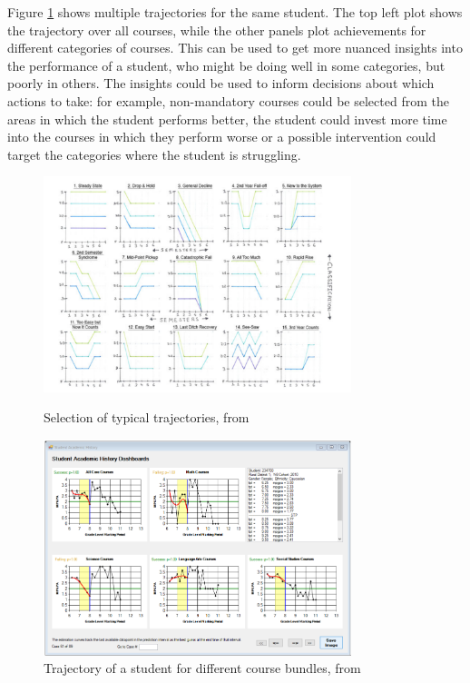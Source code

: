 Figure \ref{fig:trajectory_2.png} shows multiple trajectories for the same student.
The top left plot shows the trajectory over all courses, while the other panels plot achievements for different categories of courses.
This can be used to get more nuanced insights into the performance of a student, who might be doing well in some categories, but poorly in others.
The insights could be used to inform decisions about which actions to take: for example, non-mandatory courses could be selected from the areas in which the student performs better, the student could invest more time into the courses in which they perform worse or a possible intervention could target the categories where the student is struggling.

\begin{figure}
    \begin{minipage}[b]{0.48\textwidth}
        \centering
        \includegraphics[width=0.8\textwidth]{figures/trajectory_1.png}
        \caption{Selection of typical trajectories, from \cite{DegreePictures-Seed}}
        \label{fig:trajectory_1.png}
    \end{minipage}
    \hfill
    \begin{minipage}[b]{0.48\textwidth}
        \centering
        \includegraphics[width=0.8\textwidth]{figures/trajectory_2.png}
        \caption{Trajectory of a student for different course bundles, from \cite{Longitudinal-StudentPerformance}}
        \label{fig:trajectory_2.png}
    \end{minipage}
\end{figure}

